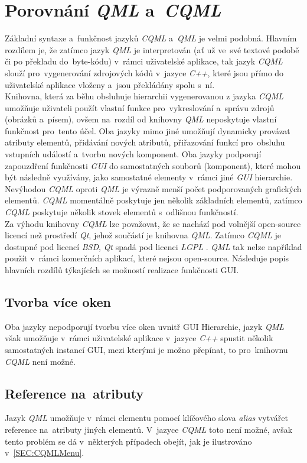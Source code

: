 \documentclass[11pt,twoside,a4paper]{book}
\begin{document}
\section{Porovnání \textit{QML} a~\textit{CQML}}
Základní syntaxe a~funkčnost jazyků \textit{CQML} a~\textit{QML} je velmi podobná. Hlavním rozdílem je, že zatímco jazyk \textit{QML} je interpretován (ať už ve~své textové podobě či po překladu do~byte-kódu) v~rámci uživatelské aplikace, tak jazyk \textit{CQML} slouží pro~vygenerování zdrojových kódů v~jazyce \textit{C++}, které jsou přímo do uživatelské aplikace vloženy a~jsou překládány spolu s~ní.\\
Knihovna, která za běhu obsluhuje hierarchii vygenerovanou z jazyka \textit{CQML} umožňuje uživateli použít vlastní funkce pro~vykreslování a~správu zdrojů (obrázků a~písem), ovšem na~rozdíl od knihovny \textit{QML} neposkytuje vlastní funkčnost pro~tento účel.
Oba jazyky mimo jiné umožňují dynamicky provázat atributy elementů, přidávání nových atributů, přiřazování funkcí pro~obsluhu vstupních událostí a~tvorbu nových komponent. Oba jazyky podporují zapouzdření funkčnosti \textit{GUI} do samostatných souborů (komponent), které mohou být následně využívány, jako samostatné elementy v~rámci jiné \textit{GUI} hierarchie.\\
Nevýhodou \textit{CQML} oproti \textit{QML} je výrazně menší počet podporovaných grafických elementů. \textit{CQML} momentálně poskytuje jen několik základních elementů, zatímco \textit{CQML} poskytuje několik stovek elementů s~odlišnou funkčností.\\
Za výhodu knihovny \textit{CQML} lze považovat, že se nachází pod volnější open-source licencí než prostředí \textit{Qt}, jehož součástí je knihovna \textit{QML}. Zatímco \textit{CQML} je dostupné pod licencí \textit{BSD}, \textit{Qt} spadá pod licenci \textit{LGPL} \cite{bib:Qlicense}. \textit{QML} tak nelze například použít v~rámci komerčních aplikací, které nejsou open-source.
Následuje popis hlavních rozdílů týkajících se možností realizace funkčnosti GUI.
\subsection{Tvorba více oken}
Oba jazyky nepodporují tvorbu více oken uvnitř GUI Hierarchie, jazyk \textit{QML} však umožňuje v~rámci uživatelské aplikace v~jazyce \textit{C++} spustit několik samostatných instancí GUI, mezi kterými je možno přepínat, to pro~knihovnu \textit{CQML} není možné.
\subsection{Reference na~atributy}
Jazyk \textit{QML} umožňuje v~rámci elementu pomocí klíčového slova \textit{alias} vytvářet reference na~atributy jiných elementů. V~jazyce \textit{CQML} toto není možné, avšak tento problém se dá v~některých případech obejít, jak je ilustrováno v~\ref{SEC:CQMLMenu}.
\end{document}
